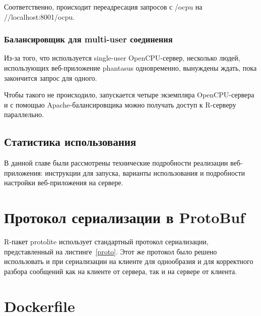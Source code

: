 \documentclass[annotation,specification]{itmo-student-thesis}
\begin{document}
Соответственно, происходит переадресация запросов с /ocpu на //localhost:8001/ocpu.
\subsection{Балансировщик для multi-user соединения}
Из-за того, что используется single-user OpenCPU-сервер, несколько людей, использующих веб-приложение phantasus одновременно, вынуждены ждать, пока закончится запрос для одного.

Чтобы такого не происходило, запускается четыре экземпляра OpenCPU-сервера и с помощью Apache-балансировщика можно получать доступ к R-серверу параллельно.

\section{Статистика использования}

\chapterconclusion
В данной главе были рассмотрены технические подробности реализации веб-приложения: инструкции для запуска, варианты использования и подробности настройки веб-приложения на сервере.

\startconclusionpage

\printmainbibliography

\appendix
\chapter{Протокол сериализации в ProtoBuf}
R-пакет protolite использует стандартный протокол сериализации, представленный на листинге~\ref{proto}. Этот же протокол было решено использовать и при сериализации на клиенте для однообразия и для корректного разбора сообщений как на клиенте от сервера, так и на сервере от клиента.

\chapter{Dockerfile}

\end{document}
